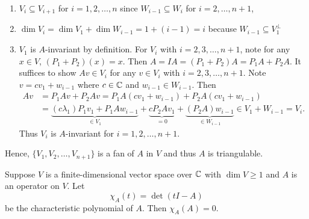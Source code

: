 \begin{proofenv}
    \begin{enumerate}[label=(\arabic*)]
        \item $V_i \subseteq V_{i+1}$ for $i=1,2,\ldots,n$ since $W_{i-1} \subseteq W_i$ for $i=2,\ldots,n+1$,
        \item $\dim V_i = \dim V_1 + \dim W_{i-1} = 1 + (i-1) = i$ because $W_{i-1} \subseteq V_1^\perp$
        \item $V_1$ is $A$-invariant by definition. For $V_i$ with $i=2,3,\ldots,n+1$, note for any $x\in V$, $(P_1 + P_2)(x) = x$. Then $A = IA = (P_1 + P_2) A = P_1 A + P_2 A$. It suffices to show $Av \in V_i$ for any $v\in V_i$ with $i=2,3,\ldots,n+1$. Note $v = cv_1 + w_{i-1}$ where $c\in \mathbb{C}$ and $w_{i-1} \in W_{i-1}$. Then
        $$
        \begin{aligned}
            Av &= P_1 A v + P_2 A v = P_1 A (cv_1 + w_{i-1}) + P_2 A (cv_1 + w_{i-1}) \\
            &= \underbrace{(c\lambda_1)P_1 v_1 + P_1 A w_{i-1}}_{\in V_1} + \underbrace{c P_2 A v_1}_{=0} + \underbrace{(P_2 A) w_{i-1}}_{\in W_{i-1}} \in V_1 + W_{i-1} = V_i.
        \end{aligned}
        $$
        Thus $V_i$ is $A$-invariant for $i=1,2,\ldots,n+1$.
    \end{enumerate}
    Hence, $\{ V_1, V_2, \ldots, V_{n+1} \}$ is a fan of $A$ in $V$ and thus $A$ is triangulable.
\end{proofenv}
\begin{theoremenv}
    Suppose $V$ is a finite-dimensional vector space over $\mathbb{C}$ with $\dim V\ge 1$ and $A$ is an operator on $V$. Let $$\chi_A(t) = \det (tI - A)$$ be the characteristic polynomial of $A$. Then $\chi_A(A) = 0$.

\end{theoremenv}
